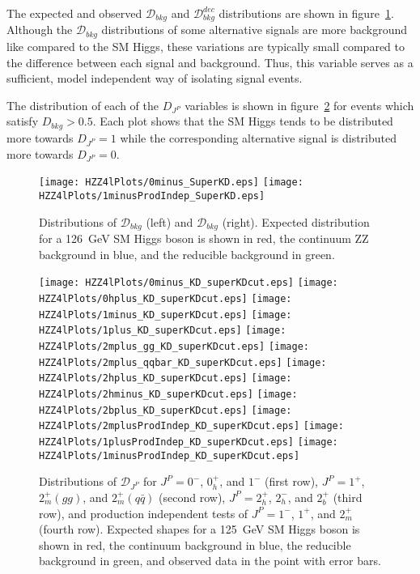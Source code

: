 The expected and observed $\mathscr{D}_{bkg}$ and 
$\mathscr{D}_{bkg}^{dec}$ distributions are shown in 
figure~\ref{fig:HZZ4lsuperMELA}.  
Although the $\mathscr{D}_{bkg}$ distributions of some 
alternative signals are more background 
like compared to the SM Higgs, these variations are typically 
small compared to the difference between each signal and 
background.  Thus, this variable serves as a sufficient, model 
independent way of isolating signal events.  

The distribution of each of the $D_{J^P}$ variables is shown in 
figure~\ref{fig:HZZ4ldjp} for events which satisfy
$D_{bkg}>0.5$.  Each plot shows that the SM 
Higgs tends
to be distributed more towards $D_{J^P}=1$ while the corresponding
alternative signal is distributed more towards $D_{J^P}=0$. 

\begin{figure}
\begin{center}
\texttt{[image: HZZ4lPlots/0minus\_SuperKD.eps]}
\texttt{[image: HZZ4lPlots/1minusProdIndep\_SuperKD.eps]}
\caption{Distributions of $\mathscr{D}_{bkg}$
(left) and $\mathscr{D}_{bkg}$ (right).  Expected distribution
for a 126~GeV SM Higgs boson is shown in red, the continuum ZZ
background in blue, and the reducible background in green.}
\label{fig:HZZ4lsuperMELA}
\end{center}
\end{figure}

\begin{figure}
\begin{center}
\texttt{[image: HZZ4lPlots/0minus\_KD\_superKDcut.eps]}
\texttt{[image: HZZ4lPlots/0hplus\_KD\_superKDcut.eps]}
\texttt{[image: HZZ4lPlots/1minus\_KD\_superKDcut.eps]}
\texttt{[image: HZZ4lPlots/1plus\_KD\_superKDcut.eps]}
\texttt{[image: HZZ4lPlots/2mplus\_gg\_KD\_superKDcut.eps]}
\texttt{[image: HZZ4lPlots/2mplus\_qqbar\_KD\_superKDcut.eps]}
\texttt{[image: HZZ4lPlots/2hplus\_KD\_superKDcut.eps]}
\texttt{[image: HZZ4lPlots/2hminus\_KD\_superKDcut.eps]}
\texttt{[image: HZZ4lPlots/2bplus\_KD\_superKDcut.eps]}
\texttt{[image: HZZ4lPlots/2mplusProdIndep\_KD\_superKDcut.eps]}
\texttt{[image: HZZ4lPlots/1plusProdIndep\_KD\_superKDcut.eps]}
\texttt{[image: HZZ4lPlots/1minusProdIndep\_KD\_superKDcut.eps]}
\caption{Distributions of $\mathscr{D}_{J^P}$ for $J^P=0^-$, 
$0_h^+$, and $1^-$ (first row), $J^P=1^+$, $2_m^+(gg)$, and 
$2_m^+(q\bar{q})$ (second row), $J^P=2_h^+$, $2_h^-$, and $2_b^+$ 
(third row), and production independent tests of $J^P=1^-$, $1^+$,
and $2_m^+$ (fourth row).  Expected shapes for a 125~GeV SM Higgs
boson is shown in red, the continuum background in blue, the
reducible background in green, and observed data in the point
with error bars.}
\label{fig:HZZ4ldjp}
\end{center}
\end{figure}

